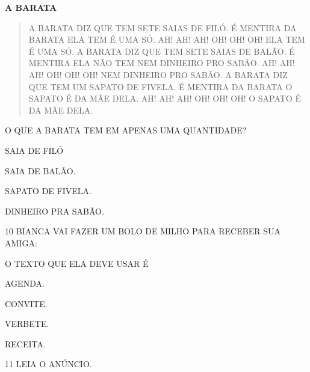 \begin{myquote}
\textbf{A BARATA}

\begin{verse}
A BARATA DIZ QUE TEM
SETE SAIAS DE FILÓ.
É MENTIRA DA BARATA
ELA TEM É UMA SÓ.
AH! AH! AH!
OH! OH! OH!
ELA TEM É UMA SÓ.
A BARATA DIZ QUE TEM
SETE SAIAS DE BALÃO.
É MENTIRA ELA NÃO TEM
NEM DINHEIRO PRO SABÃO.
AH! AH! AH!
OH! OH! OH!
NEM DINHEIRO PRO SABÃO.
A BARATA DIZ QUE TEM
UM SAPATO DE FIVELA.
É MENTIRA DA BARATA
O SAPATO É DA MÃE DELA.
AH! AH! AH!
OH! OH! OH!
O SAPATO É DA MÃE DELA.
\end{verse}

\end{myquote}

O QUE A BARATA TEM EM APENAS UMA QUANTIDADE?

\begin{escolha}

\item SAIA DE FILÓ

\item SAIA DE BALÃO.

\item SAPATO DE FIVELA.

\item DINHEIRO PRA SABÃO.

\end{escolha}

\num{10} BIANCA VAI FAZER UM BOLO DE MILHO PARA RECEBER SUA AMIGA:

O TEXTO QUE ELA DEVE USAR É

\begin{escolha}

\item AGENDA.

\item CONVITE.

\item VERBETE.

\item RECEITA.

\end{escolha}

\num{11} LEIA O ANÚNCIO.

